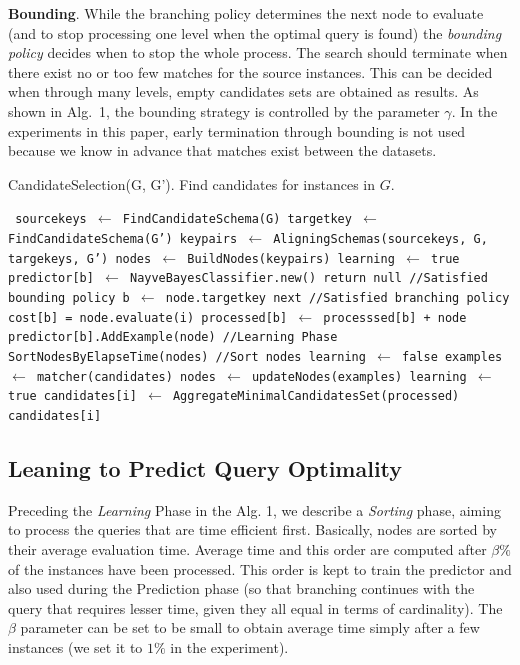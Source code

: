 \textbf{Bounding}. While the branching policy determines the next node to evaluate (and to stop processing one level when the optimal query is found)  the \emph{bounding policy} decides when to stop the whole process. The search should terminate when there exist no or too few matches for the source instances. This can be decided when through many levels, empty candidates sets are obtained as results. As shown in Alg.~1, the bounding strategy is 
controlled by the parameter $\gamma$. In the experiments in this paper, early termination through bounding is not used because we know in advance that matches exist between the datasets. 
\begin{algorithm}
\caption{CandidateSelection(G, G'). Find candidates for instances in $G$.}
\begin{algorithmic}
\scriptsize\tt
\STATE  sourcekeys  $\leftarrow$ FindCandidateSchema(G)
\STATE  targetkey  $\leftarrow$ FindCandidateSchema(G')
\STATE  keypairs  $\leftarrow$ AligningSchemas(sourcekeys, G, targekeys, G') 
\STATE  nodes  $\leftarrow$ BuildNodes(keypairs) 
\STATE  learning  $\leftarrow$ true
\STATE predictor[b] $\leftarrow$ NayveBayesClassifier.new()
\ENDFOR 
{} %
\STATE  return null //Satisfied bounding policy
\ENDIF
{}  
\STATE  b $\leftarrow$ node.targetkey
\STATE next //Satisfied branching policy 
\ENDIF
{}  
\STATE  cost[b] = node.evaluate(i) 
\STATE  processed[b] $\leftarrow$  processsed[b] + node 
\STATE    predictor[b].AddExample(node) //Learning Phase
\ENDIF 
\ENDIF 
\ENDFOR
{} 
\STATE    SortNodesByElapseTime(nodes)  //Sort nodes 
\ENDIF
{} 
\STATE    learning $\leftarrow$ false
\ENDIF
{} 
\STATE  examples  $\leftarrow$ matcher(candidates)
\STATE  nodes  $\leftarrow$ updateNodes(examples) 
\STATE    learning $\leftarrow$ true
\ENDIF
\STATE  candidates[i] $\leftarrow$ AggregateMinimalCandidatesSet(processed)
\ENDFOR 
\RETURN candidates[i]
\end{algorithmic}
\end{algorithm}

\subsection{Leaning to Predict Query Optimality} 
Preceding the \emph{Learning} Phase in the Alg. 1, we describe a \emph{Sorting}  phase, aiming to process the queries that are time efficient first. Basically, nodes are sorted by their average evaluation time. Average time and this order are computed after $\beta \%$ of the instances have been processed. This order is kept to train the predictor and also used during the Prediction phase (so that branching continues with the query that requires lesser time, given they all equal in terms of cardinality). The $\beta$ parameter can be set to be small to obtain average time simply after a few instances (we set it to $1\%$ in the experiment).
 
